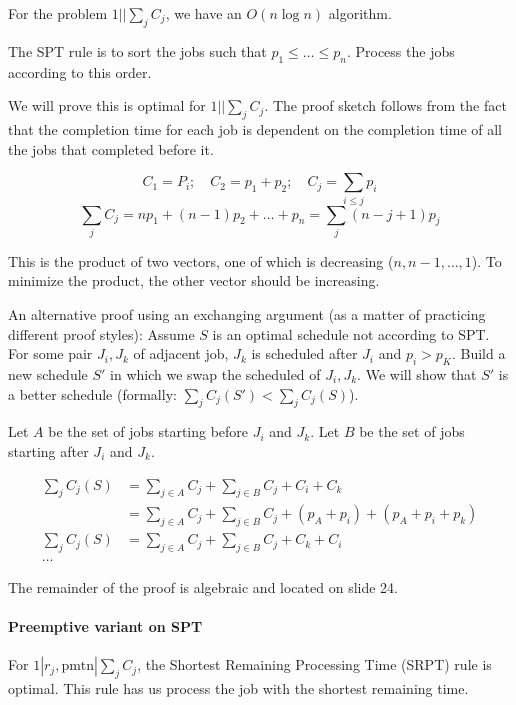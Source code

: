 \documentclass{idc_msc}
\begin{document}
For the problem \(1||\sum_j C_j\), we have an \(O(n \log n)\) algorithm.

The SPT rule is to sort the jobs such that \(p_1 \le \ldots \le p_n\).
Process the jobs according to this order.

We will prove this is optimal for \(1||\sum_j C_j\).
The proof sketch follows from the fact that the completion time for each job is dependent on the completion time of all the jobs that completed before it.

\[
C_1 = P_i ;\quad C_2 = p_1 + p_2 ;\quad C_j = \sum_{i \le j} p_i
\]
\[
\sum_j C_j = n p_1 + (n-1)p_2 + \ldots + p_n = \sum_j (n - j + 1) p_j
\]

This is the product of two vectors, one of which is decreasing (\(n, n-1, \ldots, 1\)).
To minimize the product, the other vector should be increasing.

An alternative proof using an exchanging argument (as a matter of practicing different proof styles):
Assume \(S\) is an optimal schedule not according to SPT.
For some pair \(J_i, J_k\) of adjacent job, \(J_k\) is scheduled after \(J_i\) and \(p_i > p_K\).
Build a new schedule \(S'\) in which we swap the scheduled of \(J_i, J_k\).
We will show that \(S'\) is a better schedule (formally: \(\sum_j C_j(S') < \sum_j C_j(S)\)).

Let \(A\) be the set of jobs starting before \(J_i\) and \(J_k\).
Let \(B\) be the set of jobs starting after \(J_i\) and \(J_k\).

\[
\begin{aligned}
\sum_j C_j(S) &= \sum_{j \in A} C_j + \sum_{j \in B} C_j + C_i + C_k \\
&= \sum_{j \in A} C_j + \sum_{j \in B} C_j + (p_A + p_i) + (p_A + p_i + p_k) \\
\sum_j C_j(S) &= \sum_{j \in A} C_j + \sum_{j \in B} C_j + C_k + C_i \\
\ldots
\end{aligned}
\]

The remainder of the proof is algebraic and located on slide 24.

\paragraph{Preemptive variant on SPT}

For \(1|r_j,\text{pmtn}|\sum_j C_j\), the Shortest Remaining Processing Time (SRPT) rule is optimal.
This rule has us process the job with the shortest remaining time.
\end{document}

